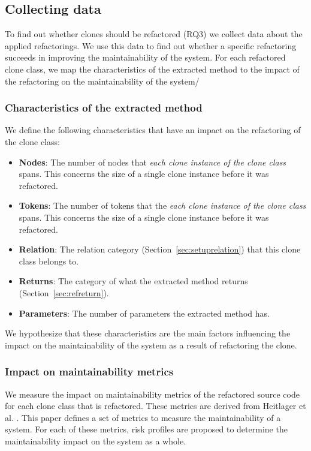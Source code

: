 \subsection{Collecting data}
To find out whether clones should be refactored (RQ3) we collect data about the applied refactorings. We use this data to find out whether a specific refactoring succeeds in improving the maintainability of the system. For each refactored clone class, we map the characteristics of the extracted method to the impact of the refactoring on the maintainability of the system/

\subsubsection{Characteristics of the extracted method} \label{sec:characteristics}
We define the following characteristics that have an impact on the refactoring of the clone class:
\begin{itemize}
\item \textbf{Nodes}: The number of nodes that \textit{each clone instance of the clone class} spans. This concerns the size of a single clone instance before it was refactored.
\item \textbf{Tokens}: The number of tokens that the \textit{each clone instance of the clone class} spans. This concerns the size of a single clone instance before it was refactored.
\item \textbf{Relation}: The relation category (Section~\ref{sec:setuprelation}) that this clone class belongs to.
\item \textbf{Returns}: The category of what the extracted method returns (Section~\ref{sec:refreturn}).
\item \textbf{Parameters}: The number of parameters the extracted method has.
\end{itemize}
We hypothesize that these characteristics are the main factors influencing the impact on the maintainability of the system as a result of refactoring the clone.

\subsubsection{Impact on maintainability metrics} \label{sec:metrics}
We measure the impact on maintainability metrics of the refactored source code for each clone class that is refactored. These metrics are derived from Heitlager et al. \cite{heitlager2007practical}. This paper defines a set of metrics to measure the maintainability of a system. For each of these metrics, risk profiles are proposed to determine the maintainability impact on the system as a whole.

